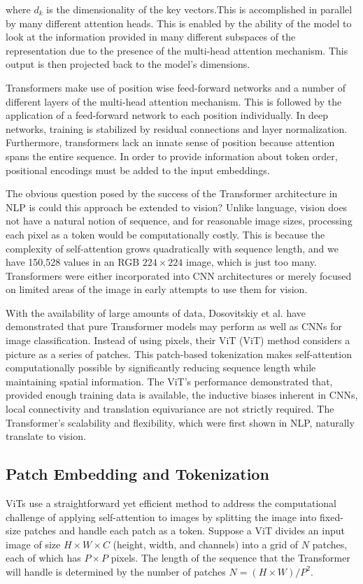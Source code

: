 \documentclass[english, LaM, oneside]{sapthesis}%
\numberwithin{equation}{chapter}
\begin{document}
where $d_k$ is the dimensionality of the key vectors.This is accomplished in parallel by many different attention heads. This is enabled by the ability of the model to look at the information provided in many different subspaces of the representation due to the presence of the multi-head attention mechanism. This output is then projected back to the model's dimensions.

Transformers make use of position wise feed-forward networks and a number of different layers of the multi-head attention mechanism. This is followed by the application of a feed-forward network to each position individually. In deep networks, training is stabilized by residual connections and layer normalization. Furthermore, transformers lack an innate sense of position because attention spans the entire sequence. In order to provide information about token order, positional encodings must be added to the input embeddings.

The obvious question posed by the success of the Transformer architecture in NLP is could this approach be extended to vision? Unlike language, vision does not have a natural notion of sequence, and for reasonable image sizes, processing each pixel as a token would be computationally costly. This is because the complexity of self-attention grows quadratically with sequence length, and we have 150,528 values in an RGB $224\times224$ image, which is just too many. Transformers were either incorporated into CNN architectures or merely focused on limited areas of the image in early attempts to use them for vision\cite{27}.

With the availability of large amounts of data, Dosovitskiy et al.\cite{4} have demonstrated that pure Transformer models may perform as well as CNNs for image classification. Instead of using pixels, their ViT (ViT) method considers a picture as a series of patches. This patch-based tokenization makes self-attention computationally possible by significantly reducing sequence length while maintaining spatial information. The ViT's performance demonstrated that, provided enough training data is available, the inductive biases inherent in CNNs, local connectivity and translation equivariance are not strictly required. The Transformer's scalability and flexibility, which were first shown in NLP, naturally translate to vision.

\subsection{Patch Embedding and Tokenization}
ViTs use a straightforward yet efficient method to address the computational challenge of applying self-attention to images by splitting the image into fixed-size patches and handle each patch as a token\cite{4}. Suppose a ViT divides an input image of size $H \times W \times C$ (height, width, and channels) into a grid of $N$ patches, each of which has $P \times P$ pixels. The length of the sequence that the Transformer will handle is determined by the number of patches $ N = (H \times W) / P^2$.
\end{document}
